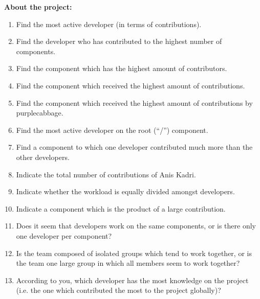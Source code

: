 \textbf{About the project:}
\begin{enumerate}
\item Find the most active developer (in terms of contributions).
\item Find the developer who has contributed to the highest number of components.
\item Find the component which has the highest amount of contributors.
\item Find the component which received the highest amount of contributions.
\item Find the component which received the highest amount of contributions by purplecabbage.
\item Find the most active developer on the root (“/”) component.
\item Find a component to which one developer contributed much more than the other developers.
\item Indicate the total number of contributions of Anis Kadri.
\item Indicate whether the workload is equally divided amongst developers.
\item Indicate a component which is the product of a large contribution.
\item Does it seem that developers work on the same components, or is there only one developer per component?
\item Is the team composed of isolated groups which tend to work together, or is the team one large group in which all members seem to work together?
\item According to you, which developer has the most knowledge on the project (i.e. the one which contributed the most to the project globally)?
\end{enumerate}